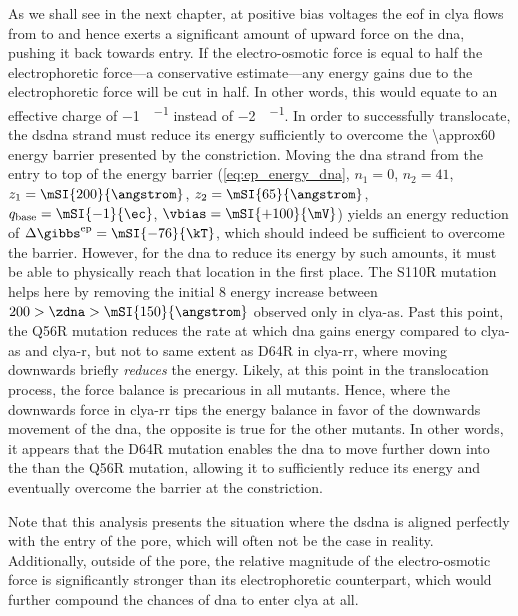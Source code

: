 As we shall see in the next chapter, at positive bias voltages the \gls{eof} in \gls{clya} flows from
\transi{} to \cisi{} and hence exerts a significant amount of upward force on the \gls{dna}, pushing it back
towards \cisi{} entry. If the electro-osmotic force is equal to half the electrophoretic force---a
conservative estimate---any energy gains due to the electrophoretic force will be cut in half. In other words,
this would equate to an effective charge of \SI{-1}{\ec\per\bp} instead of \SI{-2}{\ec\per\bp}. In order to
successfully translocate, the \gls{dsdna} strand must reduce its energy sufficiently to overcome the
\SI{\approx60}{\kT} energy barrier presented by the constriction.  Moving the \gls{dna} strand from the
\cisi{} entry to top of the energy barrier (\cref{eq:ep_energy_dna}, $n_1 = 0$, $n_2 = 41$, $z_1 =
\mSI{200}{\angstrom}$, $z_2 = \mSI{65}{\angstrom}$, $q_{\textrm{base}} = \mSI{-1}{\ec}$, $\vbias =
\mSI{+100}{\mV}$) yields an energy reduction of $\Delta \gibbs^{\textrm{ep}} = \mSI{-76}{\kT}$, which should
indeed be sufficient to overcome the barrier. However, for the \gls{dna} to reduce its energy by such amounts,
it must be able to physically reach that location in the first place. The S110R mutation helps here by
removing the initial \SI{+8}{\kT} energy increase between $200 > \zdna > \mSI{150}{\angstrom}$ observed only
in \gls{clya-as}. Past this point, the Q56R mutation reduces the rate at which \gls{dna} gains energy compared
to \gls{clya-as} and \gls{clya-r}, but not to same extent as D64R in \gls{clya-rr}, where moving downwards
briefly \emph{reduces} the energy. Likely, at this point in the translocation process, the force balance is
precarious in all mutants. Hence, where the downwards force in \gls{clya-rr} tips the energy balance in favor
of the downwards movement of the \gls{dna}, the opposite is true for the other mutants. In other words, it
appears that the D64R mutation enables the \gls{dna} to move further down into the \lumen{} than the Q56R
mutation, allowing it to sufficiently reduce its energy and eventually overcome the barrier at the
constriction.

Note that this analysis presents the situation where the \gls{dsdna} is aligned perfectly with the entry of
the pore, which will often not be the case in reality. Additionally, outside of the pore, the relative
magnitude of the electro-osmotic force is significantly stronger than its electrophoretic counterpart, which
would further compound the chances of \gls{dna} to enter \gls{clya} at all.

